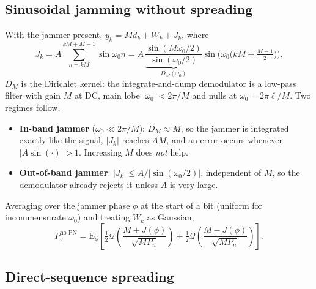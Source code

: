 \documentclass[11pt,a4paper]{article}
\newcommand{\Q}{\mathcal{Q}}
\begin{document}
\subsection{Sinusoidal jamming without spreading}

With the jammer present, $y_k = Md_k + W_k + J_k$, where
\begin{equation}
  J_k = A\sum_{n=kM}^{kM+M-1}\sin\omega_0 n
      = A\,\underbrace{\frac{\sin(M\omega_0/2)}{\sin(\omega_0/2)}}_{D_M(\omega_0)}
        \sin\!\Big(\omega_0\big(kM + \tfrac{M-1}{2}\big)\Big).
  \label{eq:jk}
\end{equation}
$D_M$ is the Dirichlet kernel: the integrate-and-dump demodulator is a low-pass
filter with gain $M$ at DC, main lobe $|\omega_0|<2\pi/M$ and nulls at
$\omega_0 = 2\pi\ell/M$. Two regimes follow.
\begin{itemize}
  \item \textbf{In-band jammer} ($\omega_0 \ll 2\pi/M$): $D_M\approx M$, so the
        jammer is integrated exactly like the signal, $|J_k|$ reaches $AM$, and an
        error occurs whenever $|A\sin(\cdot)|>1$. Increasing $M$ does \emph{not} help.
  \item \textbf{Out-of-band jammer}: $|J_k|\le A/|\sin(\omega_0/2)|$, independent of
        $M$, so the demodulator already rejects it unless $A$ is very large.
\end{itemize}
Averaging over the jammer phase $\phi$ at the start of a bit (uniform for
incommensurate $\omega_0$) and treating $W_k$ as Gaussian,
\begin{equation}
  P_e^{\text{no PN}} = \mathrm{E}_\phi\!\left[\tfrac12\Q\!\left(\frac{M+J(\phi)}{\sqrt{MP_n}}\right)
     + \tfrac12\Q\!\left(\frac{M-J(\phi)}{\sqrt{MP_n}}\right)\right].
  \label{eq:pe_nopn}
\end{equation}

\subsection{Direct-sequence spreading}
\end{document}
